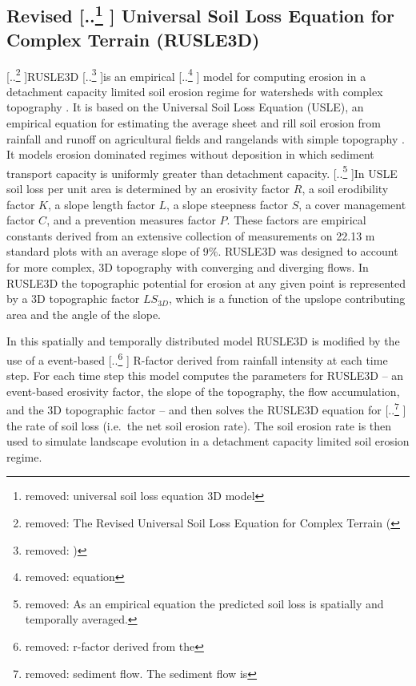 \documentclass[gmd, manuscript]{copernicus}
\providecommand{\DIFadd}[1]{{\protect\color{blue} \sf #1}} %
\providecommand{\DIFdel}[1]{{\protect\color{red} [..\footnote{removed: #1} ]}} %
\providecommand{\DIFaddbegin}{} %
\providecommand{\DIFaddend}{} %
\providecommand{\DIFdelbegin}{} %
\providecommand{\DIFdelend}{} %
\begin{document}
\DIFaddend %
\subsection{Revised \DIFdelbegin \DIFdel{universal soil loss equation 3D model}\DIFdelend \DIFaddbegin \DIFadd{Universal Soil Loss Equation for Complex Terrain (RUSLE3D)}\DIFaddend }
\label{rusle_model}
\DIFdelbegin \DIFdel{The Revised Universal Soil Loss Equation for Complex Terrain (}\DIFdelend RUSLE3D
\DIFdelbegin \DIFdel{) 
}\DIFdelend is an empirical \DIFdelbegin \DIFdel{equation }\DIFdelend \DIFaddbegin \DIFadd{model }\DIFaddend for computing erosion 
in a detachment capacity limited soil erosion regime
for watersheds with complex topography \citep{Mitasova1996}. 
It is based on 
the Universal Soil Loss Equation (USLE),
an empirical equation for estimating the average
sheet and rill soil erosion from rainfall and runoff
on agricultural fields and rangelands with simple topography 
\citep{Wischmeier1978}. 
It models erosion dominated regimes without deposition
in which sediment transport capacity is 
uniformly greater than detachment capacity.
\DIFdelbegin \DIFdel{As an empirical equation the predicted soil loss 
is spatially and temporally averaged. 
}\DIFdelend In USLE soil loss per unit area is determined by 
an erosivity factor $R$,
a soil erodibility factor $K$, 
a slope length factor $L$,
a slope steepness factor $S$,
a cover management factor $C$,
and a prevention measures factor $P$.
These factors are empirical constants derived 
from an extensive collection of measurements 
on 22.13 \unit{m} standard plots with an average slope of 9$\%$.  
RUSLE3D was designed to account for more complex, 3D topography 
with converging and diverging flows. 
In RUSLE3D the topographic potential for erosion at any given point 
is represented by a 3D topographic factor $LS_{3D}$,
which is a function of the upslope contributing area 
and the angle of the slope. 

In this spatially and temporally distributed model 
RUSLE3D is modified by the use of a 
event-based \DIFdelbegin \DIFdel{r-factor derived from the }\DIFdelend \DIFaddbegin \DIFadd{R-factor derived from }\DIFaddend rainfall intensity at each time step.
For each time step this model computes the parameters for RUSLE3D -- 
an event-based erosivity factor,
the slope of the topography, the flow accumulation, and
the 3D topographic factor -- 
and then solves the RUSLE3D equation for \DIFdelbegin \DIFdel{sediment flow. 
The sediment flow is }\DIFdelend \DIFaddbegin \DIFadd{the rate of soil loss 
(i.e.~the net soil erosion rate). 
The soil erosion rate is then }\DIFaddend used to simulate landscape evolution 
in a detachment capacity limited soil erosion regime.
\end{document}
